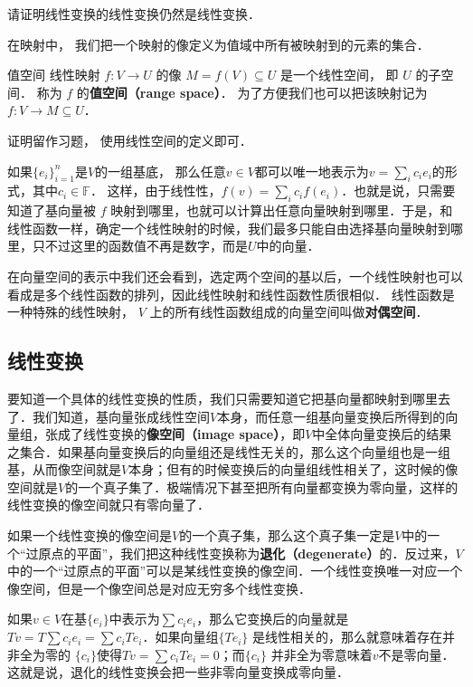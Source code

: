 \begin{exercise}{}
请证明线性变换的线性变换仍然是线性变换．
\end{exercise}

在映射中， 我们把一个映射的像定义为值域中所有被映射到的元素的集合．
\begin{theorem}{值空间}
线性映射 $f:V\to U$ 的像 $M = f(V) \subseteq U$ 是一个线性空间， 即 $U$ 的子空间． 称为 $f$ 的\textbf{值空间（range space）}． 为了方便我们也可以把该映射记为 $f: V\to M \subseteq U$．
\end{theorem}
证明留作习题， 使用线性空间的定义即可．

如果$\{{e}_i\}_{i=1}^n$是$V$的一组基底， 那么任意${v}\in V$都可以唯一地表示为${v}=\sum_i c_i {e}_i$的形式，其中$c_i\in\mathbb{F}$． 这样，由于线性性，$f({v})=\sum_ic_if({e}_i)$．也就是说，只需要知道了基向量被 $f$ 映射到哪里，也就可以计算出任意向量映射到哪里．于是，和线性函数一样，确定一个线性映射的时候，我们最多只能自由选择基向量映射到哪里，只不过这里的函数值不再是数字，而是$U$中的向量．

在向量空间的表示中我们还会看到，选定两个空间的基以后，一个线性映射也可以看成是多个线性函数的排列，因此线性映射和线性函数性质很相似． 线性函数是一种特殊的线性映射， $V$ 上的所有线性函数组成的向量空间叫做\textbf{对偶空间}．

\subsection{线性变换}

要知道一个具体的线性变换的性质，我们只需要知道它把基向量都映射到哪里去了．我们知道，基向量张成线性空间$V$本身，而任意一组基向量变换后所得到的向量组，张成了线性变换的\textbf{像空间（image space）}，即$V$中全体向量变换后的结果之集合．如果基向量变换后的向量组还是线性无关的，那么这个向量组也是一组基，从而像空间就是$V$本身；但有的时候变换后的向量组线性相关了，这时候的像空间就是$V$的一个真子集了．极端情况下甚至把所有向量都变换为零向量，这样的线性变换的像空间就只有零向量了．

如果一个线性变换的像空间是$V$的一个真子集，那么这个真子集一定是$V$中的一个“过原点的平面”，我们把这种线性变换称为\textbf{退化（degenerate）}的．反过来，$V$中的一个“过原点的平面”可以是某线性变换的像空间．一个线性变换唯一对应一个像空间，但是一个像空间总是对应无穷多个线性变换．

如果${v}\in V$在基$\{{e}_i\}$中表示为$\sum c_i {e}_i$，那么它变换后的向量就是$T {v}=T\sum c_i {e}_i=\sum c_iT {e}_i$．如果向量组$\{T {e}_i\}$ 是线性相关的，那么就意味着存在并非全为零的 $\{c_i\}$使得$T {v}=\sum c_iT {e}_i=0$；而$\{c_i\}$ 并非全为零意味着${v}$不是零向量．这就是说，退化的线性变换会把一些非零向量变换成零向量．

